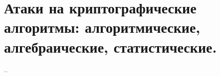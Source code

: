 \section{Атаки на криптографические алгоритмы: алгоритмические, алгебраические, статистические.}

--
